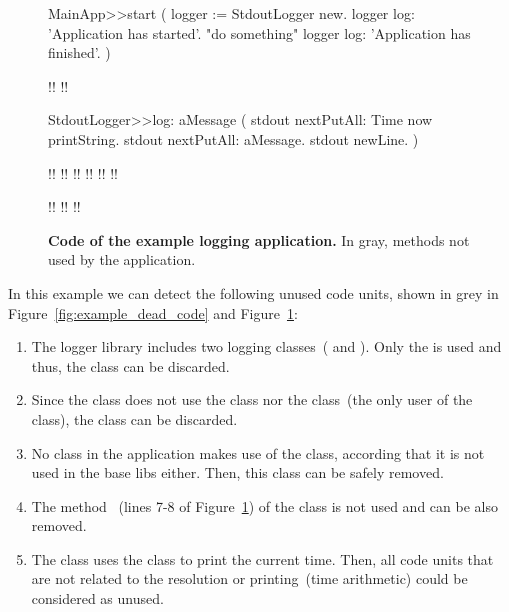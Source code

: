 \begin{figure}[ht]
\begin{code}
MainApp>>start (
    logger := StdoutLogger new.
    logger log: 'Application has started'.
    "do something"
    logger log: 'Application has finished'. )

!!
!!

StdoutLogger>>log: aMessage (
    stdout nextPutAll: Time now printString.
    stdout nextPutAll: aMessage.
    stdout newLine. )
    
!!
!!
!!
!!
!!
!!

!!
!!
!!
\end{code}

\caption{ \small\textbf{Code of the example logging application.} In gray, methods not used by the application.\label{fig:code_example1}}
\end{figure}

In this example we can detect the following unused code units, shown in grey in Figure~\ref{fig:example_dead_code} and Figure~\ref{fig:code_example1}:
\begin{enumerate}
\item The logger library includes two logging classes~( and ). Only the  is used and thus, the  class can be discarded.
\item Since the  class does not use the  class nor the  class~(the only user of the  class), the  class can be discarded.
\item No class in the application makes use of the  class, according that it is not used in the base libs either. Then, this class can be safely removed.
\item The method ~(lines 7-8 of Figure~\ref{fig:code_example1}) of the  class is not used and can be also removed.
\item The  class uses the  class to print the current time. Then, all code units that are not related to the  resolution or printing~(\ie time arithmetic) could be considered as unused.
\end{enumerate}

